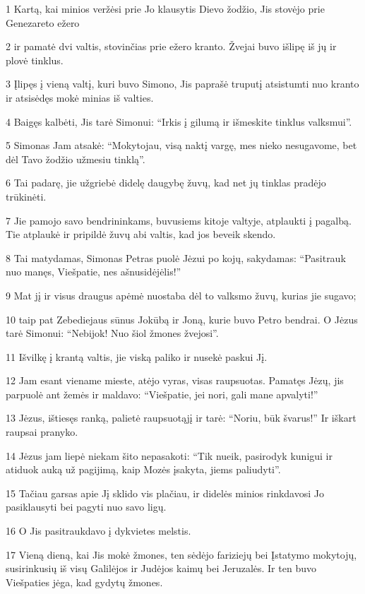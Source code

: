 \par 1 Kartą, kai minios veržėsi prie Jo klausytis Dievo žodžio, Jis stovėjo prie Genezareto ežero 
\par 2 ir pamatė dvi valtis, stovinčias prie ežero kranto. Žvejai buvo išlipę iš jų ir plovė tinklus. 
\par 3 Įlipęs į vieną valtį, kuri buvo Simono, Jis paprašė truputį atsistumti nuo kranto ir atsisėdęs mokė minias iš valties. 
\par 4 Baigęs kalbėti, Jis tarė Simonui: “Irkis į gilumą ir išmeskite tinklus valksmui”. 
\par 5 Simonas Jam atsakė: “Mokytojau, visą naktį vargę, mes nieko nesugavome, bet dėl Tavo žodžio užmesiu tinklą”. 
\par 6 Tai padarę, jie užgriebė didelę daugybę žuvų, kad net jų tinklas pradėjo trūkinėti. 
\par 7 Jie pamojo savo bendrininkams, buvusiems kitoje valtyje, atplaukti į pagalbą. Tie atplaukė ir pripildė žuvų abi valtis, kad jos beveik skendo. 
\par 8 Tai matydamas, Simonas Petras puolė Jėzui po kojų, sakydamas: “Pasitrauk nuo manęs, Viešpatie, nes aš­nusidėjėlis!” 
\par 9 Mat jį ir visus draugus apėmė nuostaba dėl to valksmo žuvų, kurias jie sugavo; 
\par 10 taip pat Zebediejaus sūnus Jokūbą ir Joną, kurie buvo Petro bendrai. O Jėzus tarė Simonui: “Nebijok! Nuo šiol žmones žvejosi”. 
\par 11 Išvilkę į krantą valtis, jie viską paliko ir nusekė paskui Jį. 
\par 12 Jam esant viename mieste, atėjo vyras, visas raupsuotas. Pamatęs Jėzų, jis parpuolė ant žemės ir maldavo: “Viešpatie, jei nori, gali mane apvalyti!” 
\par 13 Jėzus, ištiesęs ranką, palietė raupsuotąjį ir tarė: “Noriu, būk švarus!” Ir iškart raupsai pranyko. 
\par 14 Jėzus jam liepė niekam šito nepasakoti: “Tik nueik, pasirodyk kunigui ir atiduok auką už pagijimą, kaip Mozės įsakyta, jiems paliudyti”. 
\par 15 Tačiau garsas apie Jį sklido vis plačiau, ir didelės minios rinkdavosi Jo pasiklausyti bei pagyti nuo savo ligų. 
\par 16 O Jis pasitraukdavo į dykvietes melstis. 
\par 17 Vieną dieną, kai Jis mokė žmones, ten sėdėjo fariziejų bei Įstatymo mokytojų, susirinkusių iš visų Galilėjos ir Judėjos kaimų bei Jeruzalės. Ir ten buvo Viešpaties jėga, kad gydytų žmones. 
